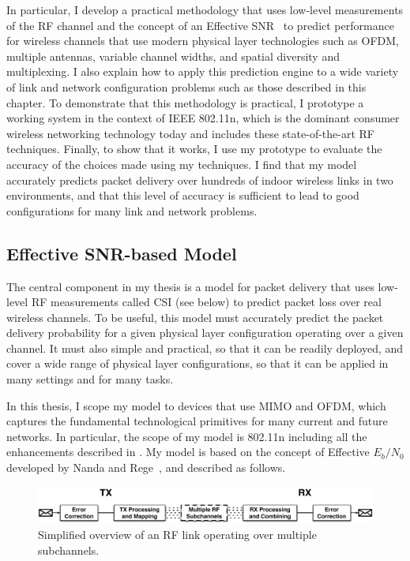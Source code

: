 In particular, I develop a practical methodology that uses low-level measurements of the RF channel and the concept of an Effective SNR~\cite{Nanda_EffectiveSNR} to predict performance for wireless channels that use modern physical layer technologies such as OFDM, multiple antennas, variable channel widths, and spatial diversity and multiplexing. I also explain how to apply this prediction engine to a wide variety of link and network configuration problems such as those described in this chapter. To demonstrate that this methodology is practical, I prototype a working system in the context of IEEE 802.11n, which is the dominant consumer wireless networking technology today and includes these state-of-the-art RF techniques. Finally, to show that it works, I use my prototype to evaluate the accuracy of the choices made using my techniques. I find that my model accurately predicts packet delivery over hundreds of indoor wireless links in two environments, and that this level of accuracy is sufficient to lead to good configurations for many link and network problems.

\subsection{Effective SNR-based Model}
The central component in my thesis is a model for packet delivery that uses low-level RF measurements called CSI (see  below) to predict packet loss over real wireless channels. To be useful, this model must accurately predict the packet delivery probability for a given physical layer configuration operating over a given channel. It must also simple and practical, so that it can be readily deployed, and cover a wide range of physical layer configurations, so that it can be applied in many settings and for many tasks.

In this thesis, I scope my model to devices that use MIMO and OFDM, which captures the fundamental technological primitives for many current and future networks. In particular, the scope of my model is 802.11n including all the enhancements described in . My model is based on the concept of Effective $E_b/N_0$ developed by Nanda and Rege~\cite{Nanda_EffectiveSNR}, and described as follows.
 
\begin{figure}[t!]
	\centering
	\includegraphics[width=\textwidth]{figures/esnr_intuitive.pdf}
	\caption[Simplified overview of an RF link operating over multiple subchannels]{\label{fig:esnr_intuitive}Simplified overview of an RF link operating over multiple subchannels.}
\end{figure}

